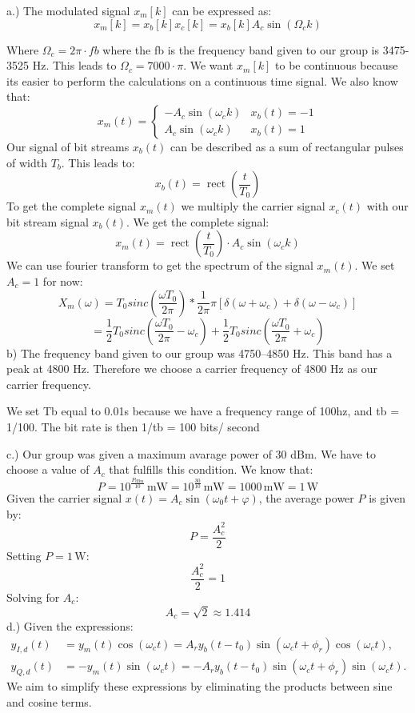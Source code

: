 \documentclass[12pt, a4paper]{article}
\begin{document}
a.) The modulated signal $x_m [k]$ can be expressed as:
\newline
$$
x_{m}[k]=x_{b}[k] x_{c}[k]=x_{b}[k] A_{c} \sin \left(\Omega_{c} k\right)
$$

Where $\Omega_{c} = 2 \pi \cdot fb$ where the fb is the frequency band given to our group is 3475-3525 Hz. This leads to $\Omega_{c} = 7000 \cdot \pi$.
\newline
We want $x_{m}[k]$ to be continuous because its easier to perform the calculations on a continuous time signal.  We also know that:
$$
x_m(t) = 
\left\{\begin{array}{ll}
-A_{c} \sin \left(\omega_{c} k\right) & x_{b}(t)=-1 \\
A_{c} \sin \left(\omega_{c} k\right) & x_{b}(t)=1
\end{array}\right.
$$
Our signal of bit streams $x_b(t)$ can be described as a sum of rectangular pulses of width $T_b$. This leads to:
$$
x_b(t)=\operatorname{rect}\left(\frac{t}{T_{0}}\right)
$$
To get the complete signal $x_m(t)$ we multiply the carrier signal $x_c(t)$ with our bit stream signal $x_b(t)$.
We get the complete signal:
$$
x_m(t) = \operatorname{rect}\left(\frac{t}{T_{0}}\right) \cdot A_{c} \sin \left(\omega_{c} k\right)
$$
We can use fourier transform to get the spectrum of the signal $x_m(t)$. We set $A_c = 1$ for now:
$$
X_m(\omega) = T_0 sinc(\frac{\omega T_0}{2 \pi}) * \frac{1}{2 \pi} \pi [\delta(\omega + \omega _c)+\delta(\omega - \omega _c)] $$
$$
= \frac{1}{2} T_0 sinc(\frac{\omega T_0 }{2 \pi} - \omega _c) +  \frac{1}{2} T_0 sinc(\frac{\omega T_0 }{2 \pi} + \omega _c) 
$$
b) The frequency band given to our group was 4750–4850 Hz. This band has a peak at 4800 Hz. Therefore we choose a carrier frequency of 4800 Hz as our carrier frequency.

We set Tb equal to 0.01s because we have a frequency range of 100hz, and tb = 1/100. The bit rate is then 1/tb = 100 bits/ second

c.) Our group was given a maximum avarage power of 30 dBm. We have to choose a value of $A_c$ that fulfills this condition. We know that:
 \[
   P = 10^{\frac{P_{\text{dBm}}}{10}} \, \text{mW} = 10^{\frac{30}{10}} \, \text{mW} = 1000 \, \text{mW} = 1 \, \text{W}
   \]
Given the carrier signal \( x(t) = A_c \sin(\omega_0 t + \varphi) \), the average power \( P \) is given by:
   \[
   P = \frac{A_c^2}{2}
   \]
   Setting \( P = 1 \, \text{W} \):
   \[
   \frac{A_c^2}{2} = 1
   \]
   Solving for \( A_c \):
   \[
   A_c = \sqrt{2} \approx 1.414
   \]
d.)
Given the expressions:
\begin{align*}
y_{I,d}(t) &= y_m(t) \cos(\omega_c t) = A_r y_b(t - t_0) \sin(\omega_c t + \phi_r) \cos(\omega_c t), \\
y_{Q,d}(t) &= -y_m(t) \sin(\omega_c t) = -A_r y_b(t - t_0) \sin(\omega_c t + \phi_r) \sin(\omega_c t).
\end{align*}
We aim to simplify these expressions by eliminating the products between sine and cosine terms.
\end{document}
